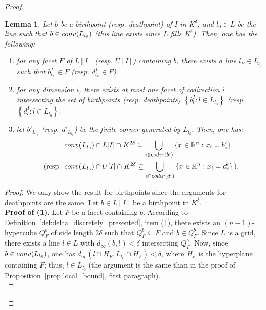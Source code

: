 \documentclass{article}
\newcommand{\conv}[1]{ {\rm conv}(#1) }
\newcommand{\codir}[1]{ {\rm codir}(#1) }
\newcommand{\R}{\mathbb{R}}
\newcommand{\upperb}[1]{ U[#1] }
\newcommand{\lowerb}[1]{ L[#1] }
\newtheorem{lemma}[theorem]{Lemma}
\begin{document}
\begin{proof}
	\begin{lemma}\label{lemma:local_control}
		Let $b$ be a birthpoint (resp. deathpoint) of $I$ in $K^ \delta$,
		and $l_0\in L$ be the line such that $b \in \conv{L_{l_0}}$ (this line exists since $L$ fills $K^{\delta}$).
		Then, one has the following:
		\begin{enumerate}
			\item for any facet $F$ of $\lowerb{I}$ (resp. $\upperb{I}$) containing $b$,
				there exists a line $l_F \in L_{l_0}$ such that $b_{l_F}^I \in F$ (resp. $d_{l_F}^I \in F$).
			\item for any dimension $i$, there exists at most one facet of codirection $i$ intersecting the
				set of birthpoints (resp. deathpoints) $ \left\{ b_l^I : l \in L_{l_0}\right\}$ (resp. $ \left\{ d_l^I : l \in L_{l_0}\right\}$.
				\item let $b'_{L_{l_0}}$ (resp. $d'_{L_{l_0}}$) be the finite corner generated by $L_{l_0}$. Then, one has:
					\begin{align*}
						& \conv{L_{l_0}}\cap \lowerb{I} \cap K^{2\delta} \subseteq \bigcup_{i \in \codir{b'}} \left\{ x \in \R^n: x_i  = b'_i \right\}         \\
						\text{ (resp.           } & \conv{L_{l_0}}\cap \upperb{I} \cap K^{2\delta} \subseteq \bigcup_{i \in \codir{d'}} \left\{ x \in\R^n: x_i  = d'_i \right\}\text{)}. \\
					\end{align*}
			\end{enumerate}
		\end{lemma}

		\begin{proof} We only show the result for birthpoints since the arguments for deathpoints are the same. Let $b\in\lowerb{I}$ be a birthpoint in $K^ \delta$.\\

			\textbf{Proof of (1).} Let $F$ be a facet containing $b$.
			According to Definition~\ref{def:delta_discretely_presented}, item (1), there exists an $(n-1)$-hypercube $Q^b_F$ of side length $2 \delta$
			such that $Q^b_F\subseteq F$ and $b\in Q^b_F$.
			Since $L$ is a grid, there exists a line $l\in L$ with $d_{\infty}(b,l) < \delta$ intersecting $Q^b_F$.
			Now, since $b \in \conv{L_{l_0}}$, one has $d_{\infty}(l \cap H_F,L_{l_0} \cap H_F) < \delta$, where $H_F$ is
			the hyperplane containing $F$; thus, $l \in L_{l_0}$ (the argument is the same than in the proof of Proposition~\ref{prop:local_bound}, first paragraph).\\


\end{proof}
\end{proof}
\end{document}
